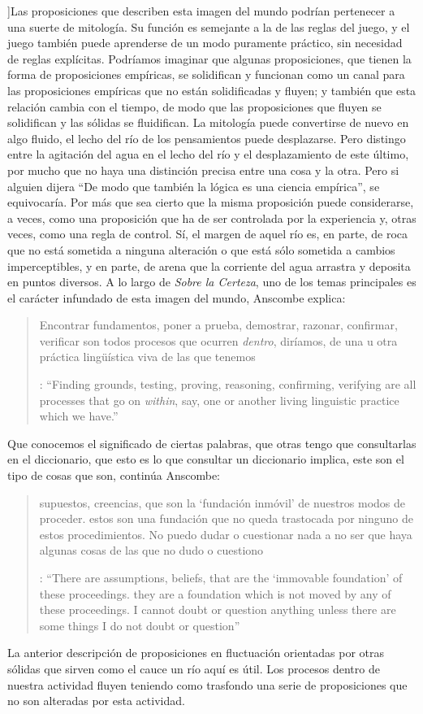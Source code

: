 ]{Las proposiciones que describen esta imagen del mundo podrían pertenecer a una suerte de mitología. Su función es semejante a la de las reglas del juego, y el juego también puede aprenderse de un modo puramente práctico, sin necesidad de reglas explícitas. Podríamos imaginar que algunas proposiciones, que tienen la forma de proposiciones empíricas, se solidifican y funcionan como un canal para las proposiciones empíricas que no están solidificadas y fluyen; y también que esta relación cambia con el tiempo, de modo que las proposiciones que fluyen se solidifican y las sólidas se fluidifican. La mitología puede convertirse de nuevo en algo fluido, el lecho del río de los pensamientos puede desplazarse. Pero distingo entre la agitación del agua en el lecho del río y el desplazamiento de este último, por mucho que no haya una distinción precisa entre una cosa y la otra. Pero si alguien dijera ``De modo que también la lógica es una ciencia empírica'', se equivocaría. Por más que sea cierto que la misma proposición puede considerarse, a veces, como una proposición que ha de ser controlada por la experiencia y, otras veces, como una regla de control. Sí, el margen de aquel río es, en parte, de roca que no está sometida a ninguna alteración o que está sólo sometida a cambios imperceptibles, y en parte, de arena que la corriente del agua arrastra y deposita en puntos diversos}.
A lo largo de \emph{Sobre la Certeza}, uno de los temas principales es el carácter infundado de esta imagen del mundo, Anscombe explica: \blockquote[{\cite[130]{anscombe1981parmenides:qli}}: \enquote{Finding grounds, testing, proving, reasoning, confirming, verifying are all processes that go on \emph{within}, say, one or another living linguistic practice which we have.}]{Encontrar fundamentos, poner a prueba, demostrar, razonar, confirmar, verificar son todos procesos que ocurren \emph{dentro}, diríamos, de una u otra práctica lingüística viva de las que tenemos}. Que conocemos el significado de ciertas palabras, que otras tengo que consultarlas en el diccionario, que esto es lo que consultar un diccionario implica, este son el tipo de cosas que son, continúa Anscombe: \blockquote[{\cite[130]{anscombe1981parmenides:qli}}: \enquote{There are assumptions, beliefs, that are the `immovable foundation' of these proceedings. \textelp{} they are a foundation which is not moved by any of these proceedings. I cannot doubt or question anything unless there are some things I do not doubt or question}]{supuestos, creencias, que son la `fundación inmóvil' de nuestros modos de proceder. \textelp{} estos son una fundación que no queda trastocada por ninguno de estos procedimientos. No puedo dudar o cuestionar nada a no ser que haya algunas cosas de las que no dudo o cuestiono}. La anterior descripción de proposiciones en fluctuación orientadas por otras sólidas que sirven como el cauce un río aquí es útil. Los procesos dentro de nuestra actividad fluyen teniendo como trasfondo una serie de proposiciones que no son alteradas por esta actividad.

